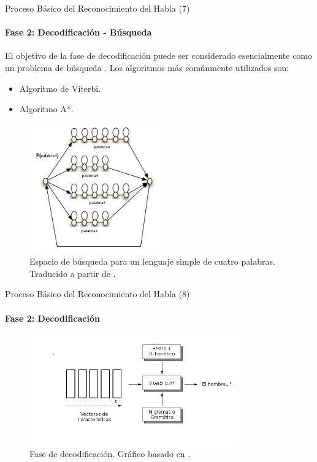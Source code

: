 \begin{frame}{Proceso B\'asico del Reconocimiento del Habla (7)}
\framesubtitle{Fase 2: Decodificaci\'on - Búsqueda}
El objetivo de la fase de decodificaci\'on puede ser considerado esencialmente como un problema de 
b\'usqueda \cite{huang-handbook10}. Los algoritmos más comúnmente utilizados son:

\begin{itemize}
    \item Algoritmo de Viterbi.
    \item Algoritmo A*.
\end{itemize}

\begin{figure}[H] 
\centering
\includegraphics[width=0.5\textwidth]{./graphics/espacio.png}
\caption{Espacio de b\'usqueda para un lenguaje simple de cuatro palabras. Traducido a partir de \cite{RenalsSearch}.}
\label{figure:espacio-busqueda}
\end{figure}

\end{frame}


\begin{frame}{Proceso B\'asico del Reconocimiento del Habla (8)}
\framesubtitle{Fase 2: Decodificaci\'on}
\begin{figure}[H] 
\centering
\includegraphics[width=0.8\textwidth]{./graphics/decodificacion.png}
\caption{Fase de decodificaci\'on. Gr\'afico basado en \cite{VerenichASR}.}
\label{figure:decoding}
\end{figure}
\end{frame}
